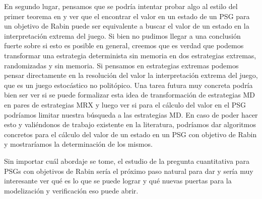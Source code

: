 En segundo lugar, pensamos que se podría intentar probar algo al estilo del
primer teorema en \cite{Polytopal} y ver que el encontrar el valor en un estado
de un PSG para un objetivo de Rabin puede ser equivalente a buscar el valor de
un estado en la interpretación extrema del juego. Si bien no pudimos llegar a
una conclusión fuerte sobre si esto es posible en general, creemos que es
verdad que podemos transformar una estrategia determinista sin memoria en dos
estrategias extremas, randomizadas y sin memoria. Si pensamos en estrategias extremas podemos
pensar directamente en la resolución del valor la interpretación extrema del
juego, que es un juego estocástico no politópico. Una tarea futura muy concreta
podría bien ser ver si se puede formalizar esta idea de transformación de
estrategias MD en pares de estrategias MRX y luego ver si para el cálculo del
valor en el PSG podríamos limitar nuestra búsqueda a las estrategias MD.
En caso de poder hacer esto y valiéndonos de trabajo
existente en la literatura, podríamos dar algoritmos concretos para el cálculo
del valor de un estado en un PSG con objetivo de Rabin y mostraríamos la
determinación de los mismos. %

Sin importar cuál abordaje se tome, el estudio de la pregunta cuantitativa para
PSGs con objetivos de Rabin sería el próximo paso natural para dar y sería muy
interesante ver qué es lo que se puede lograr y qué nuevas puertas para la
modelización y verificación eso puede abrir.
